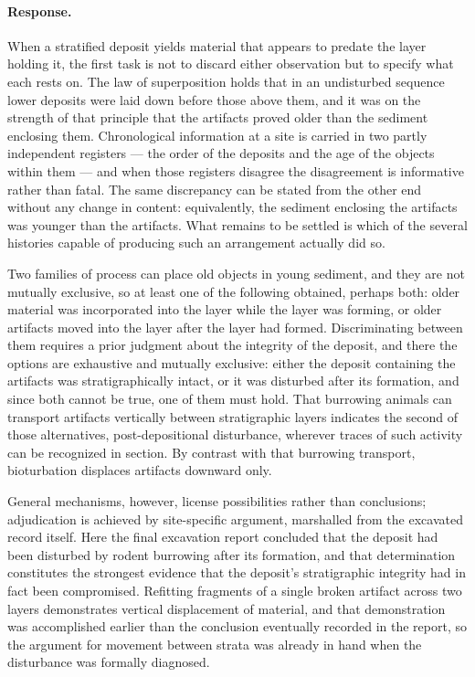 \documentclass[11pt]{article}
\begin{document}
\paragraph{Response.} {\small When a stratified deposit yields material that appears to predate the layer holding it, the first task is not to discard either observation but to specify what each rests on. The law of superposition holds that in an undisturbed sequence lower deposits were laid down before those above them, and it was on the strength of that principle that the artifacts proved older than the sediment enclosing them. Chronological information at a site is carried in two partly independent registers — the order of the deposits and the age of the objects within them — and when those registers disagree the disagreement is informative rather than fatal. The same discrepancy can be stated from the other end without any change in content: equivalently, the sediment enclosing the artifacts was younger than the artifacts. What remains to be settled is which of the several histories capable of producing such an arrangement actually did so.

Two families of process can place old objects in young sediment, and they are not mutually exclusive, so at least one of the following obtained, perhaps both: older material was incorporated into the layer while the layer was forming, or older artifacts moved into the layer after the layer had formed. Discriminating between them requires a prior judgment about the integrity of the deposit, and there the options are exhaustive and mutually exclusive: either the deposit containing the artifacts was stratigraphically intact, or it was disturbed after its formation, and since both cannot be true, one of them must hold. That burrowing animals can transport artifacts vertically between stratigraphic layers indicates the second of those alternatives, post-depositional disturbance, wherever traces of such activity can be recognized in section. By contrast with that burrowing transport, bioturbation displaces artifacts downward only.

General mechanisms, however, license possibilities rather than conclusions; adjudication is achieved by site-specific argument, marshalled from the excavated record itself. Here the final excavation report concluded that the deposit had been disturbed by rodent burrowing after its formation, and that determination constitutes the strongest evidence that the deposit's stratigraphic integrity had in fact been compromised. Refitting fragments of a single broken artifact across two layers demonstrates vertical displacement of material, and that demonstration was accomplished earlier than the conclusion eventually recorded in the report, so the argument for movement between strata was already in hand when the disturbance was formally diagnosed.

}
\end{document}
